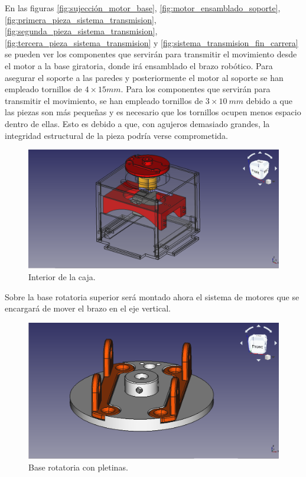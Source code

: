 En las figuras \ref{fig:sujección_motor_base}, \ref{fig:motor_ensamblado_soporte}, \ref{fig:primera_pieza_sistema_transmision},
\ref{fig:segunda_pieza_sistema_transmision},
\ref{fig:tercera_pieza_sistema_transmision} y \ref{fig:sistema_transmision_fin_carrera} se pueden ver los componentes que servirán para transmitir el movimiento desde el motor a la base giratoria, donde irá ensamblado el brazo robótico. Para asegurar el soporte a las paredes y posteriormente el motor al soporte se han empleado tornillos de $4 \times 15 mm$. Para los componentes que servirán para transmitir el movimiento, se han empleado tornillos de $3 \times 10~mm$ debido a que las piezas son más pequeñas y es necesario que los tornillos ocupen menos espacio dentro de ellas. Esto es debido a que, con agujeros demasiado grandes, la integridad estructural de la pieza podría verse comprometida.

\begin{figure}[H]
    \centering 
    \includegraphics[width=1\linewidth]{pictures/CajaConPiezasInternas.png}
    \caption{Interior de la caja.}
    \label{fig:interior_caja_sujeccion}
\end{figure}

Sobre la base rotatoria superior será montado ahora el sistema de motores que se encargará de mover el brazo en el eje vertical.

\begin{figure}[H]
    \centering 
    \includegraphics[width=1\linewidth]{pictures/BaseRotatoriaConPletinas.png}
    \caption{Base rotatoria con pletinas.}
    \label{fig:base_rotatoria_pletinas}
\end{figure}

